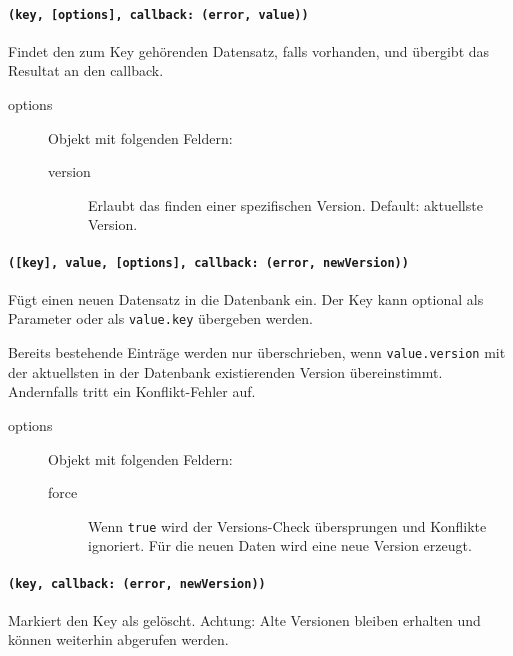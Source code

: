 
\paragraph{\texttt{(key, [options], callback: (error, value))}}
Findet den zum Key gehörenden Datensatz, falls vorhanden, und übergibt das Resultat an den callback.
\begin{description}
\item[options] Objekt mit folgenden Feldern:
\begin{description}
\item[version] Erlaubt das finden einer spezifischen Version. Default: aktuellste Version.
\end{description}
\end{description}

\paragraph{\texttt{([key], value, [options], callback: (error, newVersion))}}
Fügt einen neuen Datensatz in die Datenbank ein. Der Key kann optional als Parameter oder als \texttt{value.key} übergeben werden.

Bereits bestehende Einträge werden nur überschrieben, wenn \texttt{value.version} mit der aktuellsten in der Datenbank existierenden Version übereinstimmt. Andernfalls tritt ein Konflikt-Fehler auf.

\begin{description}
\item[options] Objekt mit folgenden Feldern:
    \begin{description}
    \item[force] Wenn \texttt{true} wird der Versions-Check übersprungen und Konflikte ignoriert. Für die neuen Daten wird eine neue Version erzeugt.
    \end{description}
\end{description}


\paragraph{\texttt{(key, callback: (error, newVersion))}}
Markiert den Key als gelöscht. Achtung: Alte Versionen bleiben erhalten und können weiterhin abgerufen werden.


